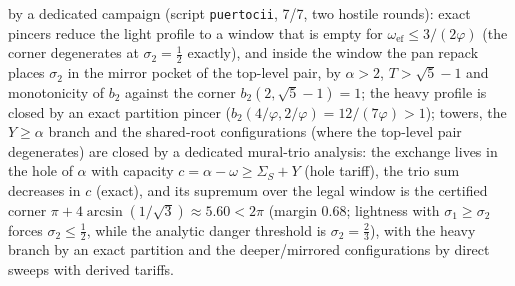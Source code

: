 \documentclass[11pt]{article}
\theoremstyle{definition}
\begin{document}
by a dedicated campaign (script \texttt{puertocii}, 7/7, two hostile
rounds): exact pincers reduce the light profile to a window that is
empty for $\omega_{\mathrm{ef}}\le3/(2\varphi)$ (the corner
degenerates at $\sigma_2=\tfrac12$ exactly), and inside the window
the pan repack places $\sigma_2$ in the mirror pocket of the
top-level pair, by $\alpha>2$, $T>\sqrt5-1$ and monotonicity of
$b_2$ against the corner $b_2(2,\sqrt5-1)=1$; the heavy profile is
closed by an exact partition pincer ($b_2(4/\varphi,2/\varphi)
=12/(7\varphi)>1$); towers, the $Y\ge\alpha$ branch and the
shared-root configurations (where the top-level pair degenerates)
are closed by a dedicated mural-trio analysis: the exchange lives in
the hole of $\alpha$ with capacity $c=\alpha-\omega\ge\Sigma_S+Y$
(hole tariff), the trio sum decreases in $c$ (exact), and its
supremum over the legal window is the certified corner
$\pi+4\arcsin(1/\sqrt3)\approx5.60<2\pi$ (margin $0.68$; lightness
with $\sigma_1\ge\sigma_2$ forces $\sigma_2\le\tfrac12$, while the
analytic danger threshold is $\sigma_2=\tfrac23$), with the heavy
branch by an exact partition and the deeper/mirrored configurations
by direct sweeps with derived tariffs.
\end{document}
